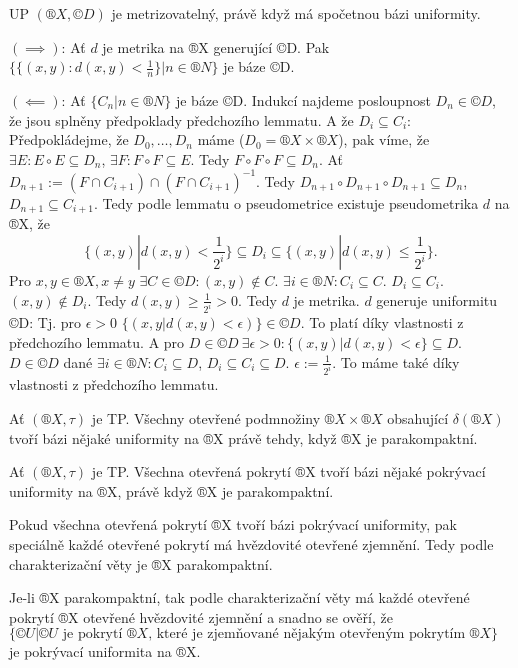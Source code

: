 \documentclass[12pt]{article}                   %
\begin{document}
    \begin{veta}[Metrizovatelnost UP]
        UP $(®X, ©D)$ je metrizovatelný, právě když má spočetnou bázi uniformity.

        \begin{dukazin}
            $(\implies)$: Ať $d$ je metrika na ®X generující ©D. Pak $\{\{(x, y): d(x, y) < \frac{1}{n}\} | n \in ®N\}$ je báze ©D.

            $(\impliedby)$: Ať $\{C_n | n \in ®N\}$ je báze ©D. Indukcí najdeme posloupnost $D_n \in ©D$, že jsou splněny předpoklady předchozího lemmatu. A že $D_i \subseteq C_i$: Předpokládejme, že $D_0, …, D_n$ máme ($D_0 = ®X \times ®X$), pak víme, že $\exists E: E \circ E \subseteq D_n$, $\exists F: F \circ F \subseteq E$. Tedy $F \circ F \circ F \subseteq D_n$. Ať $D_{n+1} := (F \cap C_{i+1}) \cap (F \cap C_{i+1})^{-1}$. Tedy $D_{n+1}\circ D_{n+1} \circ D_{n+1} \subseteq D_n$, $D_{n+1} \subseteq C_{i+1}$. Tedy podle lemmatu o pseudometrice existuje pseudometrika $d$ na ®X, že
            $$ \{(x, y) | d(x, y) < \frac{1}{2^i}\} \subseteq D_i \subseteq \{(x, y) | d(x, y) ≤ \frac{1}{2^i}\}. $$
            Pro $x, y \in ®X, x≠y$ $\exists C \in ©D: (x, y) \notin C$. $\exists i \in ®N: C_i \subseteq C$. $D_i \subseteq C_i$. $(x, y)\notin D_i$. Tedy $d(x, y) ≥ \frac{1}{2^i} > 0$. Tedy $d$ je metrika. $d$ generuje uniformitu ©D: Tj. pro $\epsilon > 0$ $\{(x, y | d(x, y) < \epsilon)\} \in ©D$. To platí díky vlastnosti z předchozího lemmatu. A pro $D \in ©D\ \exists \epsilon > 0: \{(x, y) | d(x, y) < \epsilon\} \subseteq D$. $D \in ©D$ dané $\exists i \in ®N: C_i \subseteq D$, $D_i \subseteq C_i \subseteq D$. $\epsilon := \frac{1}{2^i}$. To máme také díky vlastnosti z předchozího lemmatu.
        \end{dukazin}
    \end{veta}

    \begin{veta}
        Ať $(®X, \tau)$ je TP. Všechny otevřené podmnožiny $®X \times ®X$ obsahující $\delta(®X)$ tvoří bázi nějaké uniformity na ®X právě tehdy, když ®X je parakompaktní.

        \begin{poznamkain}[Reformulace]
            Ať $(®X, \tau)$ je TP. Všechna otevřená pokrytí ®X tvoří bázi nějaké pokrývací uniformity na ®X, právě když ®X je parakompaktní.
        \end{poznamkain}

        \begin{dukazin}
            Pokud všechna otevřená pokrytí ®X tvoří bázi pokrývací uniformity, pak speciálně každé otevřené pokrytí má hvězdovité otevřené zjemnění. Tedy podle charakterizační věty je ®X parakompaktní.

            Je-li ®X parakompaktní, tak podle charakterizační věty má každé otevřené pokrytí ®X otevřené hvězdovité zjemnění a snadno se ověří, že $\{©U | ©U \text{ je pokrytí } ®X \text{, které je zjemňované nějakým otevřeným pokrytím } ®X\}$ je pokrývací uniformita na ®X.
        \end{dukazin}
    \end{veta}
\end{document}

